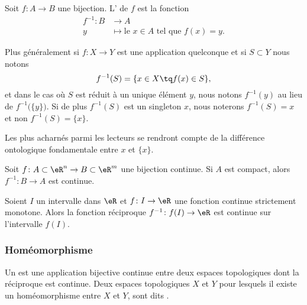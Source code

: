 \begin{definition}      \label{DEFooTRGYooRxORpY}
    Soit \( f\colon A\to B\) une bijection. L' de \( f\) est la fonction
    \begin{equation}
        \begin{aligned}
            f^{-1}\colon B&\to A \\
            y&\mapsto \text{le } x\in A\text{ tel que } f(x)=y.
        \end{aligned}
    \end{equation}
\end{definition}

Plus généralement si \( f\colon X\to Y\) est une application quelconque et si \( S\subset Y\) nous notons
\begin{equation}
    f^{-1}(S)=\{ x\in X\tq f(x)\in S \},
\end{equation}
et dans le cas où \( S\) est réduit à un unique élément \( y\), nous notons \( f^{-1}(y)\) au lieu de \( f^{-1}\big( \{ y \} \big)\). Si de plus \( f^{-1}(S)\) est un singleton \( x\), nous noterons \( f^{-1}(S)=x\) et non \( f^{-1}(S)=\{ x \}\).

Les plus acharnés parmi les lecteurs se rendront compte de la différence ontologique fondamentale entre \( x\) et \( \{ x \}\).

\begin{proposition}	\label{PropoInvCompCont}
Soit $f\colon A\subset\eR^n\to B\subset\eR^m$ une bijection continue. Si $A$ est compact, alors $f^{-1}\colon B\to A$ est continue.
\end{proposition}

\begin{proposition}		\label{PropIntContMOnIvCont}
Soient $I$ un intervalle dans $\eR$ et $f\colon I\to \eR$ une fonction continue strictement monotone. Alors la fonction réciproque $f^{-1}\colon f(I)\to \eR$ est continue sur l'intervalle $f(I)$.
\end{proposition}

\subsubsection{Homéomorphisme}

\begin{definition}
    Un  est une application bijective continue entre deux espaces topologiques dont la réciproque est continue. Deux espaces topologiques $X$ et $Y$ pour lesquels il existe un homéomorphisme entre $X$ et $Y$, sont dits .
\end{definition}

